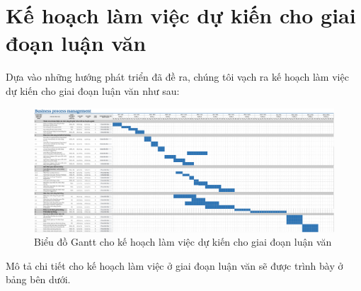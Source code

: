 \section{Kế hoạch làm việc dự kiến cho giai đoạn luận văn}
Dựa vào những hướng phát triển đã đề ra, chúng tôi vạch ra kế hoạch làm việc dự kiến cho giai đoạn luận văn như sau:
\begin{figure}[H]
    \centering
    \includegraphics[width=\linewidth]{Content/Kết luận/images/graduteschedule.png}
    \vspace{0.5cm}
    \caption{Biểu đồ Gantt cho kế hoạch làm việc dự kiến cho giai đoạn luận văn}
    \label{fig:Biểu đồ Gantt cho kế hoạch làm việc dự kiến cho giai đoạn luận văn}
\end{figure}
Mô tả chi tiết cho kế hoạch làm việc ở giai đoạn luận văn sẽ được trình bày ở bảng bên dưới.

